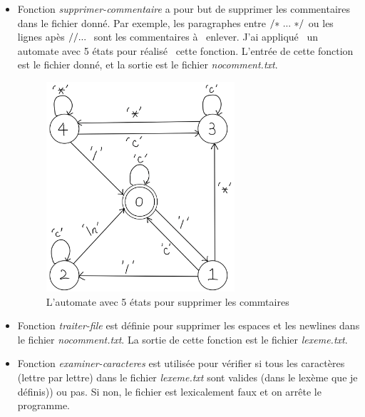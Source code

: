 \documentclass[a4paper,14pt,UTF8]{article}
\begin{document}
	\begin{itemize}
		
	\item 
	Fonction \textit{supprimer-commentaire} a pour but de supprimer les commentaires dans le fichier donné. Par exemple, les paragraphes entre ${\rm{/*}} \ ... \ {\rm{*/}}$ ou les lignes apès ${\rm{//}}... \ $ sont les commentaires à \ enlever. J'ai appliqué \ un automate avec 5 états pour réalisé \  cette fonction. L'entrée de cette fonction est le fichier donné, et la sortie est le fichier \textit{nocomment.txt}.
	
	\begin{figure}[H]
		\setlength{\abovecaptionskip}{-0.cm}
		
		\begin{center}
			\includegraphics[width=7cm]{supprimer_commentaire}
		\end{center}
		\caption{L'automate avec 5 états pour supprimer les commtaires}
	\end{figure}
	
	\item
	Fonction \textit{traiter-file} est définie pour supprimer les espaces et les newlines dans le fichier \textit{nocomment.txt}. La sortie de cette fonction est le fichier \textit{lexeme.txt}. \\
	
	\item
	Fonction \textit{examiner-caracteres} est utilisée pour vérifier si tous les caractères (lettre par lettre) dans le fichier \textit{lexeme.txt} sont valides (dans le lexème que je définis)) ou pas. Si non, le fichier est lexicalement faux et on arrête le programme.
	
	\begin{figure}[H]
		\setlength{\abovecaptionskip}{-0.cm}
		

\end{figure}
\end{itemize}
\end{document}
